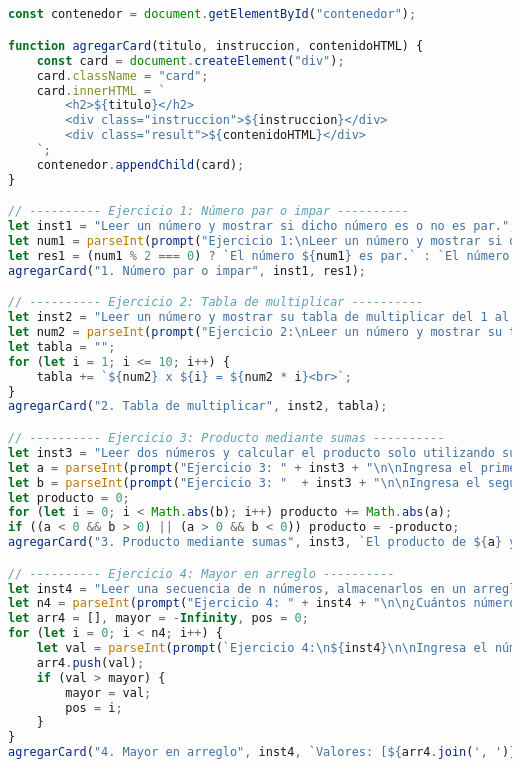 \documentclass[10pt,a4paper]{article}
\begin{document}
\subsection{\color{colorESCOM}{Código JavaScript (Parte 1)}}
\begin{lstlisting}[language=JavaScript]
const contenedor = document.getElementById("contenedor");

function agregarCard(titulo, instruccion, contenidoHTML) {
    const card = document.createElement("div");
    card.className = "card";
    card.innerHTML = `
        <h2>${titulo}</h2>
        <div class="instruccion">${instruccion}</div>
        <div class="result">${contenidoHTML}</div>
    `;
    contenedor.appendChild(card);
}

// ---------- Ejercicio 1: Número par o impar ----------
let inst1 = "Leer un número y mostrar si dicho número es o no es par.";
let num1 = parseInt(prompt("Ejercicio 1:\nLeer un número y mostrar si dicho número es o no es par.\n\nIngresa un número:"));
let res1 = (num1 % 2 === 0) ? `El número ${num1} es par.` : `El número ${num1} no es par.`;
agregarCard("1. Número par o impar", inst1, res1);

// ---------- Ejercicio 2: Tabla de multiplicar ----------
let inst2 = "Leer un número y mostrar su tabla de multiplicar del 1 al 10.";
let num2 = parseInt(prompt("Ejercicio 2:\nLeer un número y mostrar su tabla de multiplicar del 1 al 10.\n\nIngresa el número:"));
let tabla = "";
for (let i = 1; i <= 10; i++) {
    tabla += `${num2} x ${i} = ${num2 * i}<br>`;
}
agregarCard("2. Tabla de multiplicar", inst2, tabla);

// ---------- Ejercicio 3: Producto mediante sumas ----------
let inst3 = "Leer dos números y calcular el producto solo utilizando sumas sucesivas.";
let a = parseInt(prompt("Ejercicio 3: " + inst3 + "\n\nIngresa el primer número:"));
let b = parseInt(prompt("Ejercicio 3: "  + inst3 + "\n\nIngresa el segundo número:"));
let producto = 0;
for (let i = 0; i < Math.abs(b); i++) producto += Math.abs(a);
if ((a < 0 && b > 0) || (a > 0 && b < 0)) producto = -producto;
agregarCard("3. Producto mediante sumas", inst3, `El producto de ${a} y ${b} es: ${producto}`);

// ---------- Ejercicio 4: Mayor en arreglo ----------
let inst4 = "Leer una secuencia de n números, almacenarlos en un arreglo y mostrar la posición del mayor valor leído.";
let n4 = parseInt(prompt("Ejercicio 4: " + inst4 + "\n\n¿Cuántos números vas a ingresar?"));
let arr4 = [], mayor = -Infinity, pos = 0;
for (let i = 0; i < n4; i++) {
    let val = parseInt(prompt(`Ejercicio 4:\n${inst4}\n\nIngresa el número ${i + 1}:`));
    arr4.push(val);
    if (val > mayor) {
        mayor = val;
        pos = i;
    }
}
agregarCard("4. Mayor en arreglo", inst4, `Valores: [${arr4.join(', ')}]<br>Mayor valor: ${mayor} en posición ${pos}`);
\end{lstlisting}
\end{document}
